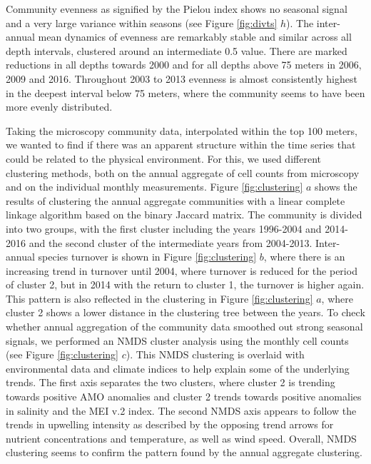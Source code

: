 \documentclass[draft]{agujournal2019}
\begin{document}
Community evenness as signified by the Pielou index shows no seasonal signal and a very large variance within seasons (see Figure \ref{fig:divts} $h$). The inter-annual mean dynamics of evenness are remarkably stable and similar across all depth intervals, clustered around an intermediate 0.5 value. There are marked reductions in all depths towards 2000 and for all depths above 75 meters in 2006, 2009 and 2016. Throughout 2003 to 2013 evenness is almost consistently highest in the deepest interval below 75 meters, where the community seems to have been more evenly distributed. 


Taking the microscopy community data, interpolated within the top 100 meters, we wanted to find if there was an apparent structure within the time series that could be related to the physical environment. For this, we used different clustering methods, both on the annual aggregate of cell counts from microscopy and on the individual monthly measurements. Figure \ref{fig:clustering} $a$ shows the results of clustering the annual aggregate communities with a linear complete linkage algorithm based on the binary Jaccard matrix. The community is divided into two groups, with the first cluster including the years 1996-2004 and 2014-2016 and the second cluster of the intermediate years from 2004-2013. 
Inter-annual species turnover is shown in Figure \ref{fig:clustering} $b$, where there is an increasing trend in turnover until 2004, where turnover is reduced for the period of cluster 2, but in 2014 with the return to cluster 1, the turnover is higher again. This pattern is also reflected in the clustering in Figure \ref{fig:clustering} $a$, where cluster 2 shows a lower distance in the clustering tree between the years. 
To check whether annual aggregation of the community data smoothed out strong seasonal signals, we performed an NMDS cluster analysis using the monthly cell counts (see Figure \ref{fig:clustering} $c$). This NMDS clustering is overlaid with environmental data and climate indices to help explain some of the underlying trends. The first axis separates the two clusters, where cluster 2 is trending towards positive AMO anomalies and cluster 2 trends towards positive anomalies in salinity and the MEI v.2 index. The second NMDS axis appears to follow the trends in upwelling intensity as described by the opposing trend arrows for nutrient concentrations and temperature, as well as wind speed. Overall, NMDS clustering seems to confirm the pattern found by the annual aggregate clustering. 
\end{document}
